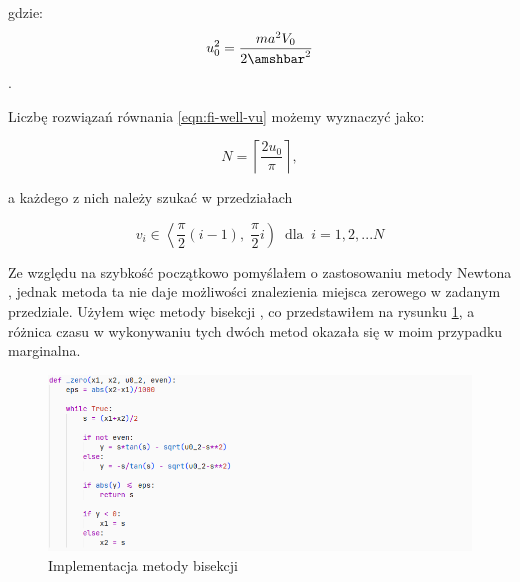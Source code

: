 \documentclass{SGGW-thesis}
\begin{document}
gdzie:
	\[u_0^2=\frac{ma^2V_0}{2\amshbar^2}\].
		
Liczbę rozwiązań równania \ref{eqn:fi-well-vu} możemy wyznaczyć jako:

	\begin{equation}
	N = \left \lceil \frac{2u_0}{\pi} \right \rceil,
	\end{equation}
	
a każdego z nich należy szukać w przedziałach

	\begin{equation}\label{v-range}
	v_i \in \left< \frac{\pi}{2}(i-1), \; \frac{\pi}{2}i \right) \;\; \textrm{dla} \; \; i = 1, 2, ... N
	\end{equation}
	
	Ze względu na szybkość początkowo pomyślałem o zastosowaniu metody Newtona \cite{newton-method}, jednak metoda ta nie daje możliwości znalezienia miejsca zerowego w zadanym przedziale. Użyłem więc metody bisekcji \cite{bisection-method}, co przedstawiłem na rysunku \ref{fig:bisection}, a różnica czasu w wykonywaniu tych dwóch metod okazała się w moim przypadku marginalna.
		
	\begin{figure}[h]
		\includegraphics[width=\textwidth,height=\textheight,keepaspectratio]{bisection.png}
		\caption{Implementacja metody bisekcji}
		\label{fig:bisection}
	\end{figure}
\end{document}
